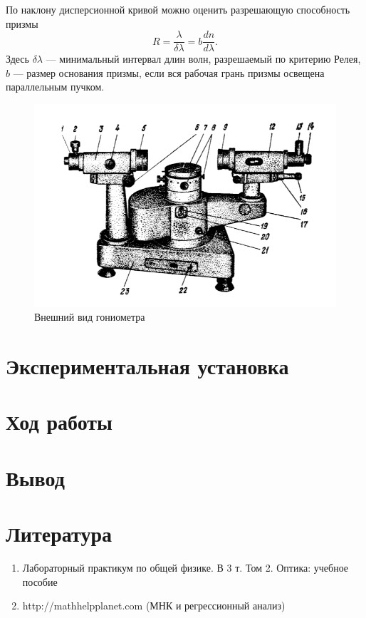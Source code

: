 \documentclass[a4paper, 12pt]{article}%
\begin{document}
	По наклону дисперсионной кривой можно оценить разрешающую
	способность призмы
	\begin{equation}
	R = \dfrac{\lambda}{\delta\lambda} = b\dfrac{dn}{d\lambda}.
	\end{equation}
	Здесь $\delta\lambda$ --- минимальный интервал длин волн, разрешаемый по критерию Релея, $b$ --- размер основания призмы, если вся рабочая грань призмы освещена параллельным пучком.
	
		\begin{figure}[!h]
		\begin{center}
			\includegraphics[scale = 0.40]{pic/443-2.png}
			\caption{Внешний вид гониометра}
		\end{center}
	\end{figure}

\section{Экспериментальная установка}

\section{Ход работы}

\section{Вывод}

\section{Литература}

\begin{enumerate}

\item Лабораторный практикум по общей физике. В 3 т. Том 2. Оптика: учебное пособие

\item http://mathhelpplanet.com (МНК и регрессионный анализ)


\end{enumerate}	
\end{document}
